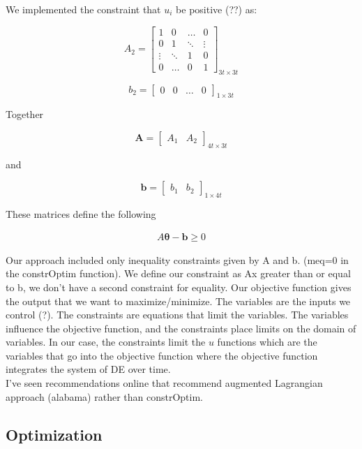\documentclass[12pt, oneside]{article}   	%
\begin{document}
\noindent We implemented the constraint that $u_i $ be positive (??) as:

\[
A_2=
  \begin{bmatrix}
    1		& 0 	 	& \ldots 	& 0  	 \\
    0 	 	& 1  		& \ddots 	& \vdots  \\
    \vdots   & \ddots 	& 1		& 0  \\
    0 		& \ldots 	& 0 		& 1  
  \end{bmatrix}_{ 3t \times 3t}
\]

\[
b_2=
  \begin{bmatrix}
    0 & 0 & \dots & 0
  \end{bmatrix}_{ 1 \times 3t }
\]

\noindent Together 

\[
\bm{A} = \begin{bmatrix}
    A_1 & A_2 
\end{bmatrix}_{ 4t \times 3t }
\] 

\noindent and

\[
\bm{b} = \begin{bmatrix}
    b_1 & b_2 
\end{bmatrix}_{ 1 \times 4t }
\] 

\noindent These matrices define the following 

\begin{align}
A \bm{\theta} - \bm{b} \geq 0 
\end{align}

\noindent Our approach included only inequality constraints given by A and b. (meq=0 in the constrOptim function). We define our constraint as Ax greater than or equal to b, we don't have a second constraint for equality. Our objective function gives the output that we want to maximize/minimize. The variables are the inputs we control (?). The constraints are equations that limit the variables. The variables influence the objective function, and the constraints place limits on the domain of variables. In our case, the constraints limit the $u$ functions which are the variables that go into the objective function where the objective function integrates the system of DE over time.  \\

\iffalse
\noindent I've seen recommendations online that recommend augmented Lagrangian approach (alabama) rather than constrOptim. 

\subsection*{Optimization}
\end{document}
